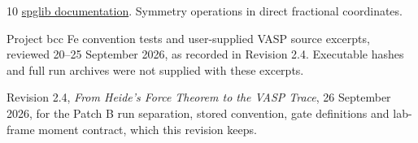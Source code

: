 \documentclass[11pt,a4paper]{article}
\numberwithin{equation}{section}
\newcommand{\code}[1]{\texttt{\detokenize{#1}}}
\begin{document}
\begin{thebibliography}{10}
\href{https://spglib.readthedocs.io/en/v2.8.0/api/autodoc/spglib.spg.html}{spglib documentation}.
Symmetry operations in direct fractional coordinates.

Project bcc Fe convention tests and user-supplied VASP source excerpts,
reviewed 20--25 September 2026, as recorded in Revision 2.4.
Executable hashes and full run archives were not supplied with these excerpts.

Revision 2.4, \emph{From Heide's Force Theorem to the VASP Trace},
26 September 2026, for the Patch B run separation, stored \code{COCC} convention,
gate definitions and lab-frame moment contract, which this revision keeps.
\end{thebibliography}
\end{document}
